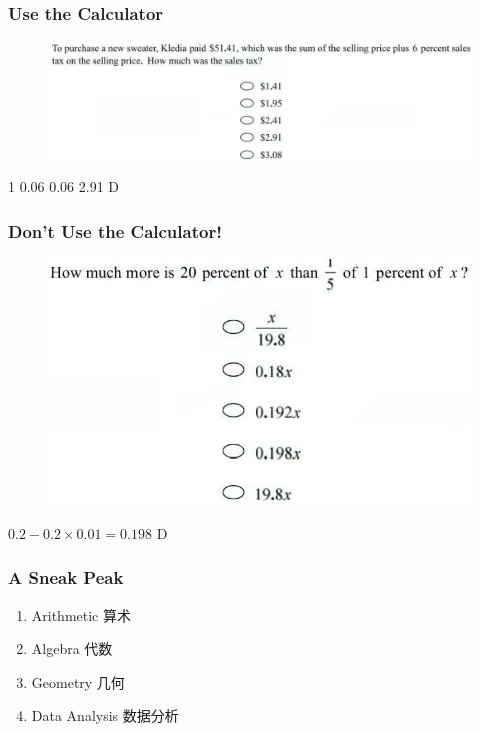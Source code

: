 \documentclass[
	11pt, %
]{beamer}
\begin{document}

\begin{frame}
	\frametitle{Use the Calculator}
	\begin{figure}
		\includegraphics[width=\linewidth]{Calculator_Example_2.png}
	\end{figure}
	 \fbox{$\div$} \fbox{(} 1 \fbox{+} 0.06 \fbox{)} \fbox{$\times$} 0.06 \fbox{=} 2.91  D
\end{frame}


\begin{frame}
	\frametitle{Don't Use the Calculator!}
	\begin{figure}
		\includegraphics[width=\linewidth]{Calculator_Example_1.png}
	\end{figure}
	\pause
	$0.2 - 0.2 \times 0.01 = 0.198$ D
\end{frame}

\begin{frame}
	\frametitle{A Sneak Peak}
	\begin{enumerate}
		\item {\LARGE Arithmetic 算术}
		\item {\LARGE Algebra 代数} 
		\item {\LARGE Geometry 几何}
		\item {\LARGE Data Analysis 数据分析}

	\end{enumerate}
\end{frame}
\end{document}
